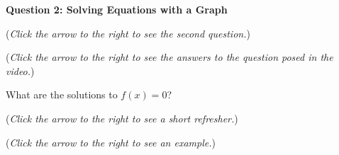 \documentclass{ximera}
\begin{document}
\textbf{Question 2: Solving Equations with a Graph}
\begin{question}
\begin{flushright}
{\color{blue}(\emph{Click the arrow to the right to see the second question.})}
\end{flushright}
\begin{center}
\begin{expandable}
{\color{blue}(\emph{Click the arrow to the right to see the answers 
to the question posed in the video.})}
\begin{expandable}
What are the solutions to $f(x)=0$?
\begin{multipleChoice}
\end{multipleChoice}
\begin{flushright}
{\color{blue}(\emph{Click the arrow to the right to see a short refresher.})}
\end{flushright}
\begin{expandable}
\end{expandable}
\begin{flushright}
{\color{blue}(\emph{Click the arrow to the right to see an example.})}
\end{flushright}
\begin{expandable}
\end{expandable}
\end{expandable}
\end{expandable}
\end{center}
\end{question}
\end{document}
